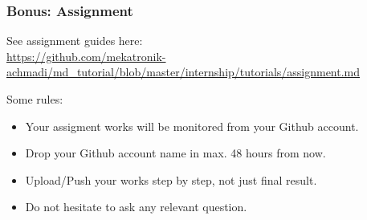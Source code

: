 \documentclass[table,dvipsnames]{beamer}
\begin{document}
	\begin{frame}
		\frametitle{Bonus: Assignment}
		\begin{exampleblock}{}
			See assignment guides here:\\
			\url{https://github.com/mekatronik-achmadi/md_tutorial/blob/master/internship/tutorials/assignment.md}
		\end{exampleblock}
		\begin{exampleblock}{}
			Some rules:
			\begin{itemize}
				\item Your assigment works will be monitored from your Github account.
				\item Drop your Github account name in max. 48 hours from now.
				\item Upload/Push your works step by step, not just final result.
				\item Do not hesitate to ask any relevant question.
			\end{itemize}
		\end{exampleblock}
	\end{frame}
\end{document}
